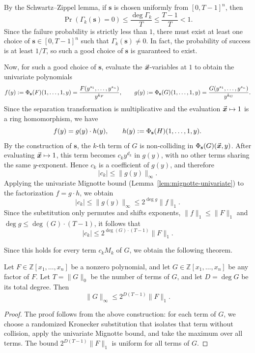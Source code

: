 \documentclass{article}
\numberwithin{equation}{section}
\begin{document}
By the Schwartz--Zippel lemma, if $\mathbf{s}$ is chosen uniformly from $[0, T-1]^n$, then
\[
\Pr(\Gamma_k(\mathbf{s}) = 0) \le \frac{\deg \Gamma_k}{T} \le \frac{T-1}{T} < 1.
\]
Since the failure probability is strictly less than $1$, there must exist at least one choice of $\mathbf{s} \in [0, T-1]^n$ such that $\Gamma_k(\mathbf{s}) \neq 0$. In fact, the probability of success is at least $1/T$, so such a good choice of $\mathbf{s}$ is guaranteed to exist.

Now, for such a good choice of $\mathbf{s}$, evaluate the $\vec{\boldsymbol{x}}$-variables at $1$ to obtain the univariate polynomials
\[
f(y) := \Phi_{\mathbf{s}}(F)(1,\dots,1,y) = \frac{F(y^{s_1}, \dots, y^{s_n})}{y^{k_F}}, \qquad
g(y) := \Phi_{\mathbf{s}}(G)(1,\dots,1,y) = \frac{G(y^{s_1}, \dots, y^{s_n})}{y^{k_G}}.
\]
Since the separation transformation is multiplicative and the evaluation $\vec{\boldsymbol{x}} \mapsto 1$ is a ring homomorphism, we have
\[
f(y) = g(y) \cdot h(y), \qquad h(y) := \Phi_{\mathbf{s}}(H)(1,\dots,1,y).
\]
By the construction of $\mathbf{s}$, the $k$-th term of $G$ is non-colliding in $\Phi_{\mathbf{s}}(G)(\vec{\boldsymbol{x}}, y)$. After evaluating $\vec{\boldsymbol{x}} \mapsto 1$, this term becomes $c_k y^{d_k}$ in $g(y)$, with no other terms sharing the same $y$-exponent. Hence $c_k$ is a coefficient of $g(y)$, and therefore
\[
|c_k| \le \|g(y)\|_\infty.
\]
Applying the univariate Mignotte bound (Lemma~\ref{lem:mignotte-univariate}) to the factorization $f = g \cdot h$, we obtain
\[
|c_k| \le \|g(y)\|_\infty \le 2^{\deg g} \|f\|_1.
\]
Since the substitution only permutes and shifts exponents, $\|f\|_1 \le \|F\|_1$ and $\deg g \le \deg(G) \cdot (T-1)$, it follows that
\[
|c_k| \le 2^{\deg(G) \cdot (T-1)} \|F\|_1.
\]

Since this holds for every term $c_k M_k$ of $G$, we obtain the following theorem.

\begin{theorem}\label{thm:sparse-mignotte}
Let $F \in \mathbb{Z}[x_1, \dots, x_n]$ be a nonzero polynomial, and let $G \in \mathbb{Z}[x_1, \dots, x_n]$ be any factor of $F$. Let $T = \|G\|_0$ be the number of terms of $G$, and let $D = \deg G$ be its total degree. Then
\[
\|G\|_\infty \le 2^{D (T-1)} \|F\|_1.
\]
\end{theorem}

\begin{proof}
The proof follows from the above construction: for each term of $G$, we choose a randomized Kronecker substitution that isolates that term without collision, apply the univariate Mignotte bound, and take the maximum over all terms. The bound $2^{D(T-1)} \|F\|_1$ is uniform for all terms of $G$.
\end{proof}
\end{document}
